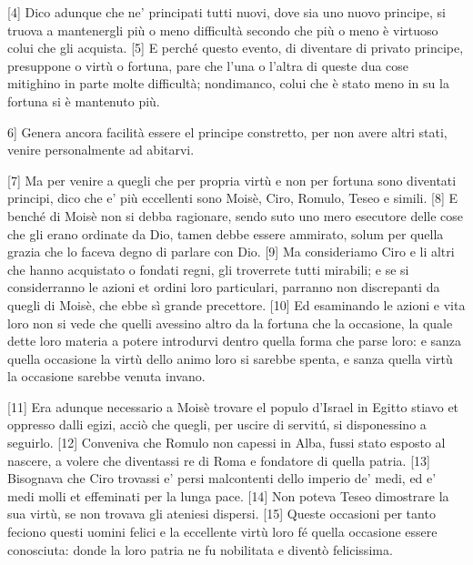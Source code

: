 {[}4{]} Dico adunque che ne' principati tutti nuovi, dove sia uno nuovo
principe, si truova a mantenergli più o meno difficultà secondo che più
o meno è virtuoso colui che gli acquista. {[}5{]} E perché questo
evento, di diventare di privato principe, presuppone o virtù o fortuna,
pare che l'una o l'altra di queste dua cose mitighino in parte molte
difficultà; nondimanco, colui che è stato meno in su la fortuna si è
mantenuto più.

\quebra

\noindent{}{[}6{]} Genera ancora facilità essere el principe
constretto, per non avere altri stati, venire personalmente ad abitarvi.

{[}7{]} Ma per venire a quegli che per propria virtù e non per fortuna
sono diventati principi, dico che e' più eccellenti sono Moisè, Ciro,
Romulo, Teseo e simili. {[}8{]} E benché di Moisè non si debba
ragionare, sendo suto uno mero esecutore delle cose che gli erano
ordinate da Dio, tamen debbe essere ammirato, solum per quella grazia
che lo faceva degno di parlare con Dio. {[}9{]} Ma consideriamo Ciro e
li altri che hanno acquistato o fondati regni, gli troverrete tutti
mirabili; e se si considerranno le azioni et ordini loro particulari,
parranno non discrepanti da quegli di Moisè, che ebbe sì grande
precettore. {[}10{]} Ed esaminando le azioni e vita loro non si vede che
quelli avessino altro da la fortuna che la occasione, la quale dette
loro materia a potere introdurvi dentro quella forma che parse loro: e
sanza quella occasione la virtù dello animo loro si sarebbe spenta, e
sanza quella virtù la occasione sarebbe venuta invano.

{[}11{]} Era adunque necessario a Moisè trovare el populo d'Israel in
Egitto stiavo et oppresso dalli egizi, acciò che quegli, per uscire di
servitú, si disponessino a seguirlo. {[}12{]} Conveniva che Romulo non
capessi in Alba, fussi stato esposto al nascere, a volere che diventassi
re di Roma e fondatore di quella patria. {[}13{]} Bisognava che Ciro
trovassi e' persi malcontenti dello imperio de' medi, ed e' medi molli
et effeminati per la lunga pace. {[}14{]} Non poteva Teseo dimostrare la
sua virtù, se non trovava gli ateniesi dispersi. {[}15{]} Queste
occasioni per tanto feciono questi uomini felici e la eccellente virtù
loro fé quella occasione essere conosciuta: donde la loro patria ne fu
nobilitata e diventò felicissima.

